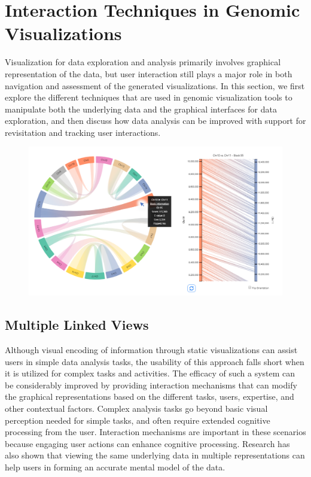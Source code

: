 \section{Interaction Techniques in Genomic Visualizations}
Visualization for data exploration and analysis primarily involves graphical representation of the data, but user interaction still plays a major role in both navigation and assessment of the generated visualizations.  In this section, we first explore the different techniques that are used in genomic visualization tools to manipulate both the underlying data and the graphical interfaces for data exploration, and then discuss how data analysis can be improved with support for revisitation and tracking user interactions.

\begin{figure}
  \centering
  \includegraphics[width=0.95\linewidth]{images/ch_2_accusyn.PNG}
  \label{fig:ch_2_accusyn}
\end{figure}


\subsection{Multiple Linked Views}

Although visual encoding of information through static visualizations can assist users in simple data analysis tasks, the usability of this approach falls short when it is utilized for complex tasks and activities\cite{tominski2015interaction,dix1998starting,pike2009science,piringer2009multi,yi2007toward,sedig2013interaction}. The efficacy of such a system can be considerably improved by providing interaction mechanisms that can modify the graphical representations based on the different tasks, users, expertise, and other contextual factors\cite{sedig2013interaction}. Complex analysis tasks go beyond basic visual perception needed for simple tasks, and often require extended cognitive processing from the user. Interaction mechanisms are important in these scenarios because engaging user actions can enhance cognitive processing\cite{sedig2013interaction}. Research has also shown that viewing the same underlying data in multiple representations can help users in forming an accurate mental model of the data\cite{larkin1987diagram,stenning1995cognitive,sedig2005designing,wang2000guidelines}.

